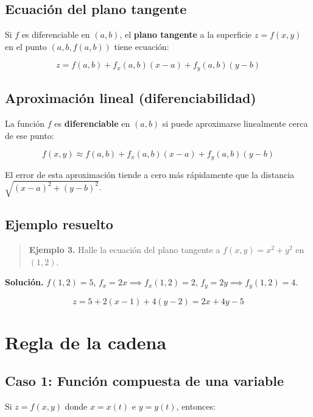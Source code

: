 \documentclass[
]{book}
\begin{document}
\subsection{Ecuación del plano tangente}\label{ecuaciuxf3n-del-plano-tangente}

Si \(f\) es diferenciable en \((a, b)\), el \textbf{plano tangente} a la superficie \(z = f(x, y)\) en el punto \((a, b, f(a, b))\) tiene ecuación:

\[
z = f(a, b) + f_x(a, b)(x - a) + f_y(a, b)(y - b)
\]

\subsection{Aproximación lineal (diferenciabilidad)}\label{aproximaciuxf3n-lineal-diferenciabilidad}

La función \(f\) es \textbf{diferenciable} en \((a, b)\) si puede aproximarse linealmente cerca de ese punto:

\[
f(x, y) \approx f(a, b) + f_x(a, b)(x - a) + f_y(a, b)(y - b)
\]

El error de esta aproximación tiende a cero más rápidamente que la distancia \(\sqrt{(x-a)^2 + (y-b)^2}\).

\subsection{Ejemplo resuelto}\label{ejemplo-resuelto-10}

\begin{quote}
\textbf{Ejemplo 3.} Halle la ecuación del plano tangente a \(f(x, y) = x^2 + y^2\) en \((1, 2)\).
\end{quote}

\textbf{Solución.} \(f(1, 2) = 5\), \(f_x = 2x \implies f_x(1, 2) = 2\), \(f_y = 2y \implies f_y(1, 2) = 4\).

\[
z = 5 + 2(x - 1) + 4(y - 2) = 2x + 4y - 5
\]

\section{Regla de la cadena}\label{regla-de-la-cadena}

\subsection{Caso 1: Función compuesta de una variable}\label{caso-1-funciuxf3n-compuesta-de-una-variable}

Si \(z = f(x, y)\) donde \(x = x(t)\) e \(y = y(t)\), entonces:
\end{document}
